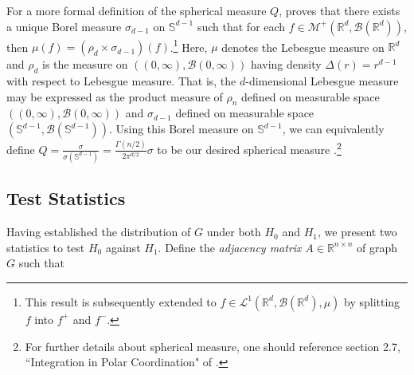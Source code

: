 \documentclass{article}
\begin{document}
For a more formal definition of the spherical measure $Q$, \cite{folland1999real} proves that there exists a unique Borel measure $\sigma_{d-1}$ on $\mathbb{S}^{d-1}$ such that for each $f \in \mathcal{M}^+(\mathbb{R}^d,\mathcal{B}(\mathbb{R}^d))$, then $\mu(f) = (\rho_d \times \sigma_{d-1})(f)$.\footnote{This result is subsequently extended to $f \in \mathcal{L}^1(\mathbb{R}^d, \mathcal{B}(\mathbb{R}^d), \mu)$ by splitting $f$ into $f^+$ and $f^-$.}  Here, $\mu$ denotes the Lebesgue measure on $\mathbb{R}^d$ and $\rho_d$ is the measure on $((0, \infty), \mathcal{B}(0, \infty))$ having density $\Delta(r) = r^{d-1}$ with respect to Lebesgue measure. That is, the $d$-dimensional Lebesgue measure may be expressed as the product measure of $\rho_n$ defined on measurable space $((0, \infty), \mathcal{B}(0, \infty))$ and $\sigma_{d-1}$ defined on measurable space $(\mathbb{S}^{d-1}, \mathcal{B}(\mathbb{S}^{d-1}))$. Using this Borel measure on $\mathbb{S}^{d-1}$, we can equivalently define  $Q = \frac{\sigma}{\sigma(\mathbb{S}^{d-1})} = \frac{\Gamma(n/2)}{2 \pi^{d/2}} \sigma$ to be our desired spherical measure \cite{folland1999real}.\footnote{For further details about spherical measure, one should reference section 2.7, ``Integration in Polar Coordination" of \cite{folland1999real}.}

\subsection{Test Statistics}
Having established the distribution of $G$ under both $H_0$ and $H_1$, we present two statistics to test $H_0$ against $H_1$. Define the \textit{adjacency matrix} $A \in \mathbb{R}^{n \times n}$ of graph $G$ such that
\end{document}
